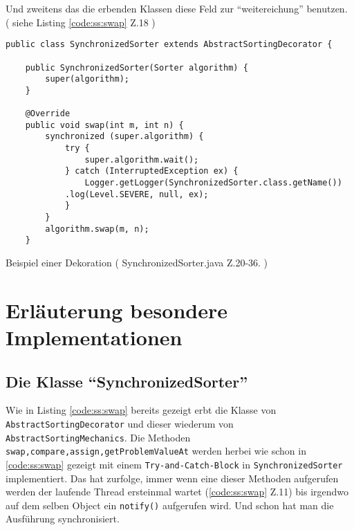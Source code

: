 Und zweitens das die erbenden Klassen diese Feld zur "`weitereichung"' benutzen. ( siehe Listing \ref{code:ss:swap} Z.18 )
\begin{listing}[H]
    \begin{verbatim}
public class SynchronizedSorter extends AbstractSortingDecorator {

    public SynchronizedSorter(Sorter algorithm) {
        super(algorithm);
    }

    @Override
    public void swap(int m, int n) {
        synchronized (super.algorithm) {
            try {
                super.algorithm.wait();
            } catch (InterruptedException ex) {
                Logger.getLogger(SynchronizedSorter.class.getName())
            .log(Level.SEVERE, null, ex);
            }
        }
        algorithm.swap(m, n);
    }
    \end{verbatim}
    \caption{ Beispiel einer Dekoration ( SynchronizedSorter.java Z.20-36. )}
    \label{code:ss:swap}
\end{listing}

\section{Erläuterung besondere Implementationen}
\subsection{Die Klasse "`SynchronizedSorter"'}

\begin{wrapfigure}{r}{0.4\textwidth}
\vspace{-40pt}
  \begin{center}
  \end{center}
  \vspace{-20pt}
  \vspace{-10pt}
\end{wrapfigure}
Wie in Listing \ref{code:ss:swap} bereits gezeigt erbt die Klasse von \texttt{AbstractSortingDecorator} und dieser wiederum von \texttt{AbstractSortingMechanics}. 
Die Methoden \newline \texttt{swap,compare,assign,getProblemValueAt} werden herbei wie schon 
in \ref{code:ss:swap} gezeigt mit einem \texttt{Try-and-Catch-Block} in \texttt{SynchronizedSorter} implementiert. Das hat zurfolge,
immer wenn eine dieser Methoden aufgerufen werden der laufende Thread ersteinmal wartet (\ref{code:ss:swap} Z.11) bis irgendwo auf dem selben 
Object ein \texttt{notify()} aufgerufen wird. Und schon hat man die Ausführung synchronisiert.

